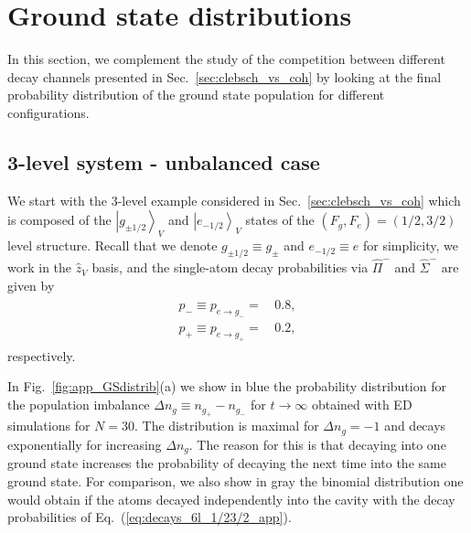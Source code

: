 \documentclass[aps,prx,superscriptaddress,twocolumn,notitlepage,nofootinbib,longbibliography]{revtex4-2}
\newcommand{\ket}[1]{\left|#1\right>}
\newcommand{\quv}{\hat{z}}
\begin{document}

\section{Ground state distributions\label{app:gs_distributions}}

In this section, we complement the study of the competition between different decay channels presented in Sec.~\ref{sec:clebsch_vs_coh} by looking at the final probability distribution of the ground state population for different configurations.


\subsection{3-level system - unbalanced case}

We start with the 3-level example considered in Sec.~\ref{sec:clebsch_vs_coh} which is composed of the $\ket{g_{\pm1/2}}_V$ and $\ket{e_{-1/2}}_V$ states of the $(F_g,F_e)=(1/2,3/2)$ level structure. Recall that we denote $g_{\pm 1/2} \equiv g_{\pm}$ and $e_{-1/2} \equiv e$ for simplicity, we work in the $\quv_V$ basis, and the single-atom decay probabilities via $\hat{\Pi}^-$ and $\hat{\Sigma}^-$ are given by
\begin{align}
\begin{aligned}
	p_- \equiv p_{e \rightarrow g_-} =&\, 0.8, \\
	p_+ \equiv p_{e \rightarrow g_+} =&\, 0.2,
\end{aligned}
\label{eq:decays_6l_1/23/2_app}
\end{align}
respectively.

In Fig.~\ref{fig:app_GSdistrib}(a) we show in blue the probability distribution for the population imbalance $\Delta n_g \equiv n_{g_+}-n_{g_-}$ for $t\rightarrow\infty$ obtained with ED simulations for $N=30$. The distribution is maximal for $\Delta n_g =-1$ and decays exponentially for increasing $\Delta n_g$. The reason for this is that decaying into one ground state increases the probability of decaying the next time into the same ground state.
For comparison, we also show in gray the binomial distribution one would obtain if the atoms decayed independently into the cavity with the decay probabilities of Eq.~(\ref{eq:decays_6l_1/23/2_app}).
\end{document}
